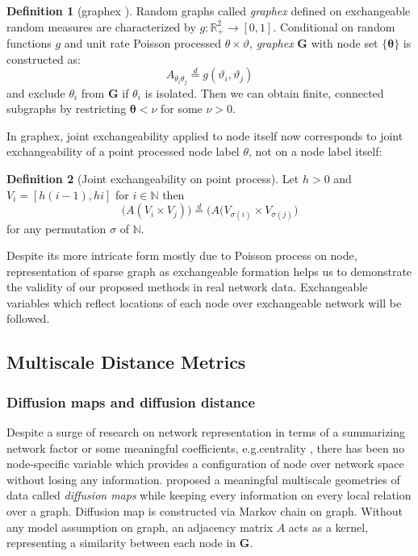 \documentclass[12pt]{article}
\theoremstyle{definition}
\newtheorem{definition}{Definition}[section]
\begin{document}
\begin{definition}[graphex \cite{kallenberg1990exchangeable}]
\label{graphex}
Random graphs called \textit{graphex} defined on exchangeable random measures are characterized by $g : \mathbb{R}^{2}_{+} \rightarrow [0,1]$. Conditional on random functions $g$ and unit rate Poisson processed $\theta \times \vartheta$,  \textit{graphex} $\mathbf{G}$ with node set $\{ \mathbf{\theta} \}$ is constructed as:
\begin{equation}
A_{\theta_{i} \theta_{j}} \stackrel{d}{=} g(\vartheta_{i}, \vartheta_{j})
\end{equation}
and exclude $\theta_{i}$ from $\mathbf{G}$ if $\theta_{i}$ is isolated. Then we can obtain finite, connected subgraphs by restricting $\mathbf{\theta}  < \nu$ for some $\nu > 0$.		
\end{definition}
In graphex, joint exchangeability applied to node itself now corresponds to joint exchangeability of a point processed node label $\theta$, not on a node label itself:
\begin{definition}[Joint exchangeability on point process]
	\label{point}
	Let $h > 0$ and  $V_{i} = [h(i-1), hi ]$ for $i \in \mathbb{N}$ then
	\begin{equation}
	\big( A( V_{i} \times V_{j}  )   \big)  \stackrel{d}{=} \big( A( V_{\sigma(i)} \times V_{\sigma(j)}     \big)
	\end{equation}	
	for any permutation $\sigma$ of $\mathbb{N}$.		
\end{definition}
Despite its more intricate form mostly due to Poisson process on node, representation of sparse graph as exchangeable formation helps us to demonstrate the validity of our proposed methods in real network data. Exchangeable variables which reflect locations of each node over exchangeable network will be followed.

\subsection{Multiscale Distance Metrics}	

\subsubsection{Diffusion maps and diffusion distance}	
Despite a surge of research on network representation in terms of a summarizing network factor \citep{hoff2002latent} or some meaningful coefficients, e.g.centrality \citep{mantzaris2013dynamic, sporns2007identification}, there has been no node-specific variable which provides a configuration of node over network space without losing any information. \cite{coifman2006diffusion} proposed a meaningful multiscale geometries of data called \textit{diffusion maps} while keeping every information on every local relation over a graph. Diffusion map is constructed via Markov chain on graph. Without any model assumption on graph, an adjacency matrix $A$ acts as a kernel, representing a similarity between each node in $\mathbf{G}$. 
	
\end{document}

